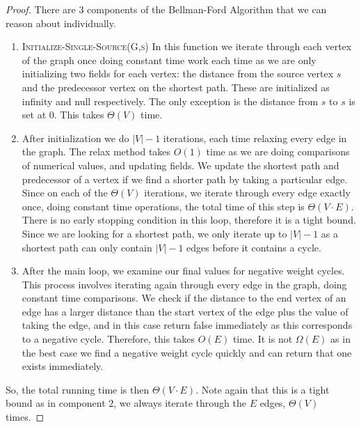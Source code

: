 \documentclass[12pt]{article}
\begin{document}
\begin{proof}
There are $3$ components of the Bellman-Ford Algorithm that we can reason about individually.
\begin{enumerate}
    \item \textsc{Initialize-Single-Source(G,s)}
    In this function we iterate through each vertex of the graph once doing constant time work each time as we are only initializing two fields for each vertex: the distance from the source vertex $s$ and the predecessor vertex on the shortest path. These are initialized as infinity and null respectively. The only exception is the distance from $s$ to $s$ is set at $0$. This takes $\Theta(V)$ time. 
    \item After initialization we do $|V|-1$ iterations, each time relaxing every edge in the graph. The relax method takes $O(1)$ time as we are doing comparisons of numerical values, and updating fields. We update the shortest path and predecessor of a vertex if we find a shorter path by taking a particular edge. Since on each of the $\Theta(V)$ iterations, we iterate through every edge exactly once, doing constant time operations, the total time of this step is $\Theta(V \cdot E)$. There is no early stopping condition in this loop, therefore it is a tight bound.  Since we are looking for a shortest path, we only iterate up to $|V|-1$ as a shortest path can only contain $|V|-1$ edges before it contains a cycle.
    \item After the main loop, we examine our final values for negative weight cycles. This process involves iterating again through every edge in the graph, doing constant time comparisons. We check if the distance to the end vertex of an edge has a larger distance than the start vertex of the edge plus the value of taking the edge, and in this case return false immediately as this corresponds to a negative cycle. Therefore, this takes $O(E)$ time. It is not $\Omega(E)$ as in the best case we find a negative weight cycle quickly and can return that one exists immediately. 
\end{enumerate}
So, the total running time is then $\Theta(V \cdot E)$. Note again that this is a tight bound as in component $2$, we always iterate through the $E$ edges, $\Theta(V)$ times.

\end{proof}

\end{document}
